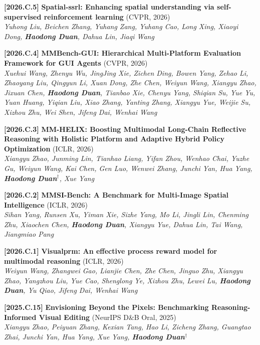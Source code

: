 \documentclass{resume}
\newcommand{\itemgap}{\vspace{-1mm}}%
\begin{document}
\textbf{[2026.C.5]} \textbf{Spatial-ssrl: Enhancing spatial understanding via self-supervised reinforcement learning} (CVPR, 2026) \\
\textit{Yuhong Liu, Beichen Zhang, Yuhang Zang, Yuhang Cao, Long Xing, Xiaoyi Dong, \textbf{Haodong Duan}, Dahua Lin, Jiaqi Wang} \\

\itemgap

\textbf{[2026.C.4]} \textbf{MMBench-GUI: Hierarchical Multi-Platform Evaluation Framework for GUI Agents} (CVPR, 2026) \\
\textit{Xuehui Wang, Zhenyu Wu, JingJing Xie, Zichen Ding, Bowen Yang, Zehao Li, Zhaoyang Liu, Qingyun Li, Xuan Dong, Zhe Chen, Weiyun Wang, Xiangyu Zhao, Jixuan Chen, \textbf{Haodong Duan}, Tianbao Xie, Chenyu Yang, Shiqian Su, Yue Yu, Yuan Huang, Yiqian Liu, Xiao Zhang, Yanting Zhang, Xiangyu Yue, Weijie Su, Xizhou Zhu, Wei Shen, Jifeng Dai, Wenhai Wang} \\
 
\itemgap

\textbf{[2026.C.3]} \textbf{MM-HELIX: Boosting Multimodal Long-Chain Reflective Reasoning with Holistic Platform and Adaptive Hybrid Policy Optimization}   (ICLR, 2026) \\
\textit{Xiangyu Zhao, Junming Lin, Tianhao Liang, Yifan Zhou, Wenhao Chai, Yuzhe Gu, Weiyun Wang, Kai Chen, Gen Luo, Wenwei Zhang, Junchi Yan, Hua Yang, \textbf{Haodong Duan$^\dag$}, Xue Yang} \\

\itemgap

\textbf{[2026.C.2]} \textbf{MMSI-Bench: A Benchmark for Multi-Image Spatial Intelligence}   (ICLR, 2026) \\
\textit{Sihan Yang, Runsen Xu, Yiman Xie, Sizhe Yang, Mo Li, Jingli Lin, Chenming Zhu, Xiaochen Chen, \textbf{Haodong Duan}, Xiangyu Yue, Dahua Lin, Tai Wang, Jiangmiao Pang} \\

\itemgap

\textbf{[2026.C.1]} \textbf{Visualprm: An effective process reward model for multimodal reasoning} (ICLR, 2026) \\
\textit{Weiyun Wang, Zhangwei Gao, Lianjie Chen, Zhe Chen, Jinguo Zhu, Xiangyu Zhao, Yangzhou Liu, Yue Cao, Shenglong Ye, Xizhou Zhu, Lewei Lu, \textbf{Haodong Duan}, Yu Qiao, Jifeng Dai, Wenhai Wang} \\

\itemgap


\textbf{[2025.C.15]} \textbf{Envisioning Beyond the Pixels: Benchmarking Reasoning-Informed Visual Editing} (NeurIPS D\&B Oral, 2025) \\
\textit{Xiangyu Zhao, Peiyuan Zhang, Kexian Tang, Hao Li, Zicheng Zhang, Guangtao Zhai, Junchi Yan, Hua Yang, Xue Yang, \textbf{Haodong Duan$^\dag$}} \\
\end{document}
